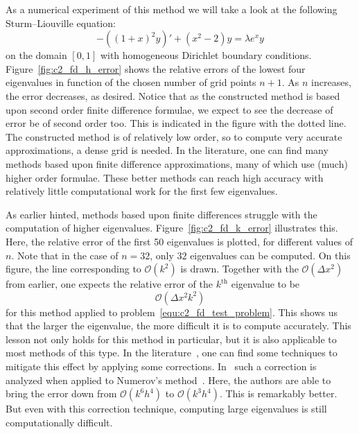 As a numerical experiment of this method we will take a look at the following Sturm--Liouville equation:
\begin{equation}\label{equ:c2_fd_test_problem}
    -\left((1+x)^2 y \right)' + (x^2 - 2) y = \lambda e^x y
\end{equation}
on the domain $[0, 1]$ with homogeneous Dirichlet boundary conditions. Figure~\ref{fig:c2_fd_h_error} shows the relative errors of the lowest four eigenvalues in function of the chosen number of grid points $n+1$. As $n$ increases, the error decreases, as desired. Notice that as the constructed method is based upon second order finite difference formulae, we expect to see the decrease of error be of second order too. This is indicated in the figure with the dotted line. The constructed method is of relatively low order, so to compute very accurate approximations, a dense grid is needed. In the literature, one can find many methods based upon finite difference approximations, many of which use (much) higher order formulae. These better methods can reach high accuracy with relatively little computational work for the first few eigenvalues.

As earlier hinted, methods based upon finite differences struggle with the computation of higher eigenvalues. Figure~\ref{fig:c2_fd_k_error} illustrates this. Here, the relative error of the first 50 eigenvalues is plotted, for different values of $n$. Note that in the case of $n = 32$, only $32$ eigenvalues can be computed. On this figure, the line corresponding to $\mathcal{O}(k^2)$ is drawn. Together with the $\mathcal{O}(\Delta x^2)$ from earlier, one expects the relative error of the $k^\text{th}$ eigenvalue to be
$$
    \mathcal{O}(\Delta x^2 k^2)
$$
for this method applied to problem~\eqref{equ:c2_fd_test_problem}. This shows us that the larger the eigenvalue, the more difficult it is to compute accurately. This lesson not only holds for this method in particular, but it is also applicable to most methods of this type. In the literature~\cite{andrew_correction_1985,vandenberghe_modified_1990,vandenberghe_accurate_1991}, one can find some techniques to mitigate this effect by applying some corrections. In~\cite{andrew_correction_1985} such a correction is analyzed when applied to Numerov's method~\cite{noumerov_method_1924}. Here, the authors are able to bring the error down from $\mathcal{O}(k^6 h^4)$ to $\mathcal{O}(k^3 h^4)$. This is remarkably better. But even with this correction technique, computing large eigenvalues is still computationally difficult.

